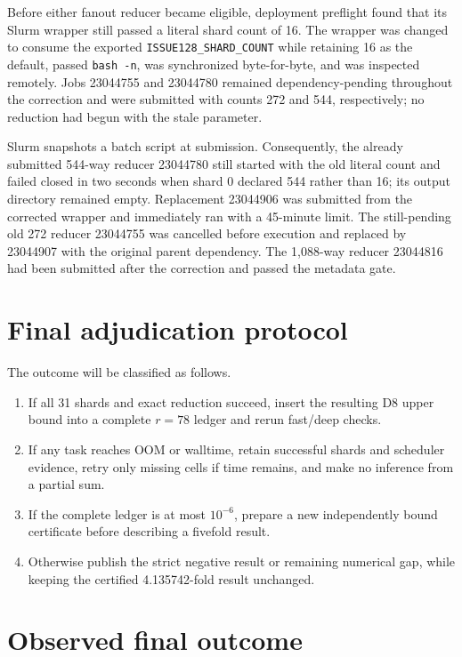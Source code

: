 \documentclass[10pt]{article}
\begin{document}
Before either fanout reducer became eligible, deployment preflight found that
its Slurm wrapper still passed a literal shard count of 16.  The wrapper was
changed to consume the exported \texttt{ISSUE128\_SHARD\_COUNT} while retaining
16 as the default, passed \texttt{bash -n}, was synchronized byte-for-byte, and
was inspected remotely.  Jobs 23044755 and 23044780 remained dependency-pending
throughout the correction and were submitted with counts 272 and 544,
respectively; no reduction had begun with the stale parameter.

Slurm snapshots a batch script at submission.  Consequently, the already
submitted 544-way reducer 23044780 still started with the old literal count and
failed closed in two seconds when shard 0 declared 544 rather than 16; its
output directory remained empty.  Replacement 23044906 was submitted from the
corrected wrapper and immediately ran with a 45-minute limit.  The still-pending
old 272 reducer 23044755 was cancelled before execution and replaced by
23044907 with the original parent dependency.  The 1,088-way reducer 23044816
had been submitted after the correction and passed the metadata gate.

\section{Final adjudication protocol}

The outcome will be classified as follows.
\begin{enumerate}
  \item If all 31 shards and exact reduction succeed, insert the resulting D8
        upper bound into a complete $r=78$ ledger and rerun fast/deep checks.
  \item If any task reaches OOM or walltime, retain successful shards and
        scheduler evidence, retry only missing cells if time remains, and make
        no inference from a partial sum.
  \item If the complete ledger is at most $10^{-6}$, prepare a new independently
        bound certificate before describing a fivefold result.
  \item Otherwise publish the strict negative result or remaining numerical
        gap, while keeping the certified 4.135742-fold result unchanged.
\end{enumerate}

\section{Observed final outcome}
\end{document}
